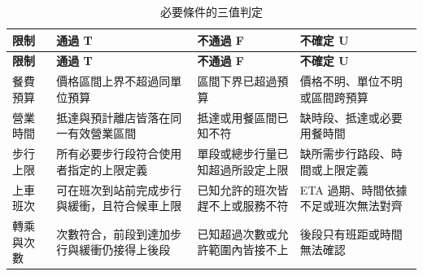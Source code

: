 {\small\singlespacing
\renewcommand{\arraystretch}{1.25}
\setlength{\tabcolsep}{3pt}
\begin{longtable}{|P{\arrayrulewidth\relax}|P{\arrayrulewidth\relax}|P{\arrayrulewidth\relax}|P{\arrayrulewidth\relax}|}
\caption{必要條件的三值判定}\label{table:three_valued}\\
\hline
\textbf{限制} & \textbf{通過 T} & \textbf{不通過 F} & \textbf{不確定 U} \\ \hline
\endfirsthead
\hline
\textbf{限制} & \textbf{通過 T} & \textbf{不通過 F} & \textbf{不確定 U} \\ \hline
\endhead
餐費預算 & 價格區間上界不超過同單位預算 & 區間下界已超過預算 & 價格不明、單位不明或區間跨預算 \\ \hline
營業時間 & 抵達與預計離店皆落在同一有效營業區間 & 抵達或用餐區間已知不符 & 缺時段、抵達或必要用餐時間 \\ \hline
步行上限 & 所有必要步行段符合使用者指定的上限定義 & 單段或總步行量已知超過所設定上限 & 缺所需步行路段、時間或上限定義 \\ \hline
上車班次 & 可在班次到站前完成步行與緩衝，且符合候車上限 & 已知允許的班次皆趕不上或服務不符 & ETA 過期、時間依據不足或班次無法對齊 \\ \hline
轉乘與次數 & 次數符合，前段到達加步行與緩衝仍接得上後段 & 已知超過次數或允許範圍內皆接不上 & 後段只有班距或時間無法確認 \\ \hline
\end{longtable}
}
